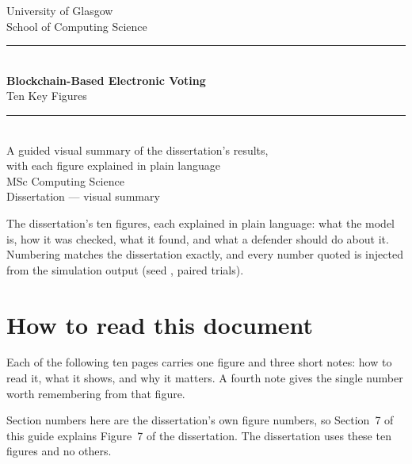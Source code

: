 \documentclass[11pt,a4paper]{article}
\begin{document}
\begin{titlepage}
\thispagestyle{empty}
\centering
\vspace*{1.6cm}

{\sffamily\Large University of Glasgow}\\[2pt]
{\sffamily\normalsize School of Computing Science}\\[3.2cm]

{\color{rule}\rule{\textwidth}{0.9pt}}\\[0.7cm]
{\sffamily\LARGE\bfseries Blockchain-Based Electronic Voting}\\[0.42cm]
{\sffamily\Large Ten Key Figures}\\[0.7cm]
{\color{rule}\rule{\textwidth}{0.9pt}}\\[1.4cm]

{\large A guided visual summary of the dissertation's results,}\\[3pt]
{\large with each figure explained in plain language}\\[3cm]

{\sffamily\large MSc Computing Science}\\[0.35cm]
{\sffamily\normalsize Dissertation --- visual summary}\\[2.2cm]

\begin{minipage}{0.84\textwidth}
\centering
{\footnotesize\color{inkmuted}
The dissertation's ten figures, each explained in plain language: what
the model is, how it was checked, what it found, and what a defender
should do about it. Numbering matches the dissertation exactly, and
every number quoted is injected from the simulation output (seed
\Seed, \TotalTrials{} paired trials).}
\end{minipage}
\vfill
\end{titlepage}

\clearpage
\section*{How to read this document}

Each of the following ten pages carries one figure and three short
notes: how to read it, what it shows, and why it matters. A fourth note
gives the single number worth remembering from that figure.

Section numbers here are the dissertation's own figure numbers, so
Section~7 of this guide explains Figure~7 of the dissertation. The
dissertation uses these ten figures and no others.
\end{document}
